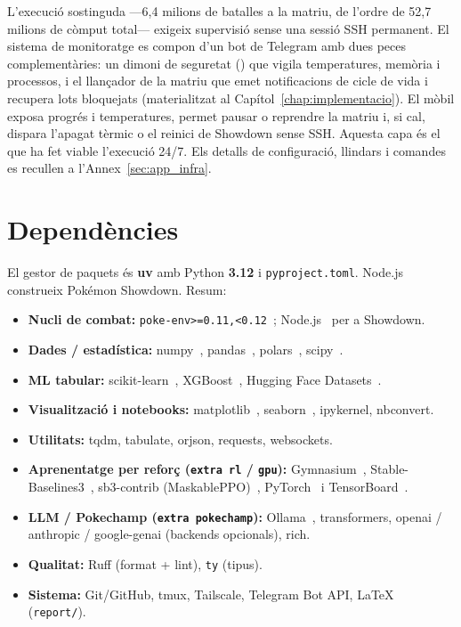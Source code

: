 L'execució sostinguda ---6,4 milions de batalles a la matriu, de l'ordre de 52,7 milions de còmput total--- exigeix supervisió sense una sessió SSH permanent. El sistema de monitoratge es compon d'un bot de Telegram amb dues peces complementàries: un dimoni de seguretat () que vigila temperatures, memòria i processos, i el llançador de la matriu que emet notificacions de cicle de vida i recupera lots bloquejats (materialitzat al Capítol~\ref{chap:implementacio}). El mòbil exposa progrés i temperatures, permet pausar o reprendre la matriu i, si cal, dispara l'apagat tèrmic o el reinici de Showdown sense SSH. Aquesta capa és el que ha fet viable l'execució 24/7. Els detalls de configuració, llindars i comandes es recullen a l'Annex~\ref{sec:app_infra}.

\section{Dependències}

El gestor de paquets és \textbf{uv} amb Python \textbf{3.12} i \texttt{pyproject.toml}. Node.js~\cite{nodejs} construeix Pokémon Showdown. Resum:

\begin{itemize}
    \item \textbf{Nucli de combat:} \texttt{poke-env>=0.11,<0.12}~\cite{poke_env}; Node.js~\cite{nodejs} per a Showdown.
    \item \textbf{Dades / estadística:} numpy~\cite{numpy}, pandas~\cite{pandas}, polars~\cite{polars}, scipy~\cite{scipy}.
    \item \textbf{ML tabular:} scikit-learn~\cite{sklearn}, XGBoost~\cite{xgboost}, Hugging Face Datasets~\cite{huggingface_datasets}.
    \item \textbf{Visualització i notebooks:} matplotlib~\cite{matplotlib}, seaborn~\cite{seaborn}, ipykernel, nbconvert.
    \item \textbf{Utilitats:} tqdm, tabulate, orjson, requests, websockets.
    \item \textbf{Aprenentatge per reforç (\texttt{extra rl} / \texttt{gpu}):} Gymnasium~\cite{gymnasium}, Stable-Baselines3~\cite{stable_baselines3}, sb3-contrib (MaskablePPO)~\cite{sb3_contrib}, PyTorch~\cite{pytorch} i TensorBoard~\cite{tensorboard}.
    \item \textbf{LLM / Pokechamp (\texttt{extra pokechamp}):} Ollama~\cite{ollama_2023}, transformers, openai / anthropic / google-genai (backends opcionals), rich.
    \item \textbf{Qualitat:} Ruff (format + lint), \texttt{ty} (tipus).
    \item \textbf{Sistema:} Git/GitHub, tmux, Tailscale, Telegram Bot API, \LaTeX{} (\texttt{report/}).
\end{itemize}

